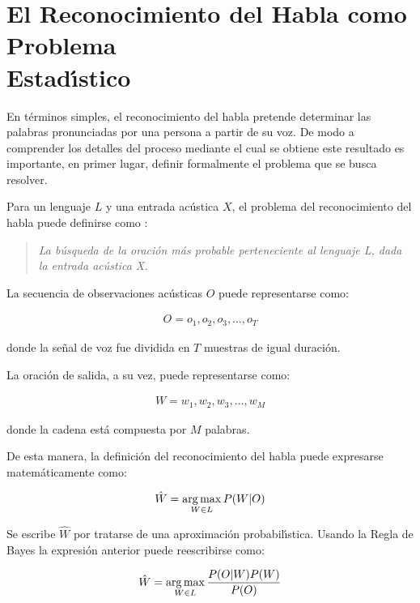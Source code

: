 
\section[El Reconocimiento del Habla como Problema Estad{\'\i}stico]
{El Reconocimiento del Habla como Problema \\ Estad{\'\i}stico}
En t\'erminos simples, el reconocimiento del habla pretende determinar las palabras pronunciadas por una persona
a partir de su voz. De modo a comprender los detalles del proceso mediante el cual se obtiene este
resultado es importante, en primer lugar, definir formalmente el problema que se busca resolver.

Para un lenguaje $L$ y una entrada ac\'ustica $X$, el problema del reconocimiento del habla puede definirse 
como \cite{Jurafsky}:

\begin{quote}
\emph{La b\'usqueda de la oraci\'on m\'as probable perteneciente al lenguaje L, dada la entrada ac\'ustica X.}
\end{quote}

La secuencia de observaciones ac\'usticas $O$ puede representarse como:

\begin{align}
O = o_1,o_2,o_3,\ldots,o_T\label{eq:asrO}
\end{align}

donde la se\~nal de voz fue dividida en $T$ muestras de igual duraci\'on.

La oraci\'on de salida, a su vez, puede representarse como:

\begin{align}
W  = w_1,w_2,w_3,\ldots,w_M\label{eq:asrW}
\end{align}

donde la cadena est\'a compuesta por $M$ palabras.

De esta manera, la definici\'on del reconocimiento del habla puede expresarse matem\'aticamente como:

\begin{align}
\hat{W} = \operatorname*{arg\,max}_{W \in L} P(W|O)
\end{align}

Se escribe $\hat{W}$ por tratarse de una aproximaci\'on probabil{\'\i}stica.
Usando la Regla de Bayes la expresi\'on anterior puede reescribirse como:

\begin{align}
\hat{W} = \operatorname*{arg\,max}_{W \in L} \frac{P(O|W)P(W)}{P(O)}
\end{align}

